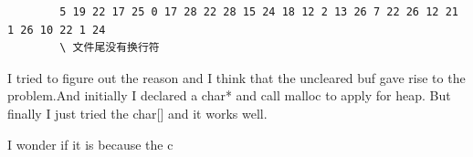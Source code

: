 \documentclass[]{article}
\begin{document}
\begin{enumerate}
\begin{verbatim}
        5 19 22 17 25 0 17 28 22 28 15 24 18 12 2 13 26 7 22 26 12 21 1 26 10 22 1 24 
        \ 文件尾没有换行符
    \end{verbatim}
    \par 
    I tried to figure out the reason and I think that the uncleared buf gave rise to the problem.And initially I declared a char* and call malloc to apply for heap.
    But finally I just tried the char[] and it works well.\par 
    I wonder if it is because the c                                                                                                                                                                                                                                                                                                                                                                                                                                                                                                                                                                                                                                                                                                                                                                                                                                                                                                                                                                                                                                                                                                                                                                                                                                                                                                                                                                                                                                                                                                                                                                                                                                                                                                                                                                                                                                                                                                                                                                                                                                                                                                                                                                                                                                                                                                                                                                                                                                                                                                                                                                                                                                                                                                                                                                                                                                                                                      
\end{enumerate}
\end{document}

